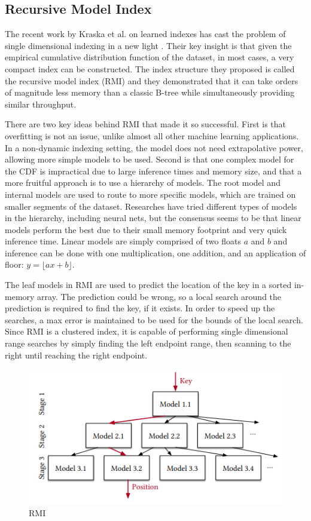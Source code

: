\documentclass[sigconf,10pt]{acmart}
\begin{document}
\subsection{Recursive Model Index}

The recent work by Kraska et al. on learned indexes
has cast the problem of single dimensional indexing in a new light \cite{Learned_Index}.
Their key insight is that given the empirical cumulative distribution function
of the dataset, in most cases, a very compact index can be constructed. 
The index structure they proposed is called the recursive model index (RMI) and they
demonstrated that it can take orders of magnitude less memory
than a classic B-tree while simultaneously providing similar throughput.

There are two key ideas behind RMI that made it so successful.
First is that overfitting is not an issue, unlike almost all other machine learning 
applications. In a non-dynamic indexing setting, the model does not need extrapolative
power, allowing more simple models to be used.
Second is that one complex model for the CDF is impractical due to large inference times
and memory size, and that a more fruitful approach is to 
use a hierarchy of models. The root model and internal models are used to route
to more specific models, which are trained on smaller segments of the dataset. 
Researches have tried different types of models in the hierarchy, including neural nets,
but the consensus seems to be that linear models perform the best due
to their small memory footprint and very quick inference time. %
Linear models are simply comprised of two floats $a$ and $b$ and inference
can be done with one multiplication, one addition, and an application of floor:
$y = \lfloor ax + b \rfloor$.

The leaf models in RMI are used to predict the location of the key in a sorted 
in-memory array. The prediction could be wrong, so a local search around the prediction
is required to find the key, if it exists. In order to speed up the searches,
a max error is maintained to be used for the bounds of the local search.
Since RMI is a clustered index, it is capable of performing single dimensional range searches
by simply finding the left endpoint range, then scanning to the right until reaching the right
endpoint.

\begin{figure}
  \includegraphics[scale=0.6]{../figures/RMI}
  \caption{RMI\cite{Learned_Index}}
  \label{RMI}
\end{figure}
\end{document}
